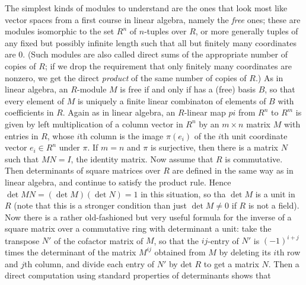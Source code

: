 The simplest kinds of modules to understand are the ones that look most like vector spaces from a first course in linear algebra, namely the {\sl free} ones; these are modules isomorphic to the set $R^n$ of $n$-tuples over $R$, or more generally tuples of any fixed but possibly infinite length such that all but finitely many coordinates are 0.  (Such modules are also called direct sums of the appropriate number of copies of $R$; if we drop the requirement that only finitely many coordinates are nonzero, we get the direct {\sl product} of the same number of copies of $R$.)  As in linear algebra, an $R$-module $M$ is free if and only if has a (free) basis $B$, so that every element of $M$ is uniquely a finite linear combinaton of elements of $B$ with coefficients in $R$.  Again as in linear algebra, an $R$-linear map $pi$ from $R^n$ to $R^m$ is given by left multiplication of a column vector in $R^n$ by an $m\times n$ matrix $M$ with entries in $R$, whose $i$th column is the image $\pi(e_i)$ of the $i$th unit coordinate vector $e_i\in R^n$ under $\pi$.  If $m=n$ and $\pi$ is surjective, then there is a matrix $N$ such that $MN = I$, the identity matrix.  Now assume that $R$ is commutative.  Then determinants of square matrices over $R$ are defined in the same way as in linear algebra, and continue to satisfy the product rule.  Hence $\det MN =(\det M)(\det N) = 1$ in this situation, so tha
$\det M$ is a unit in $R$ (note that this is a stronger condition than just $\det M\ne0$ if $R$ is not a field).  Now there is a rather old-fashioned but very useful formula for the inverse of a square matrix over a commutative ring with determinant a unit:  take the transpose $N'$ of the cofactor matrix of
 $M$, so that the $ij$-entry of $N'$ is $(-1)^{i+j}$ times the determinant of the matrix $M^{ij}$ obtained from $M$ by deleting its $i$th row and $j$th column, and divide each entry of $N'$ by det $R$ to get a matrix $N$.  Then a direct computation using standard properties of determinants shows that
